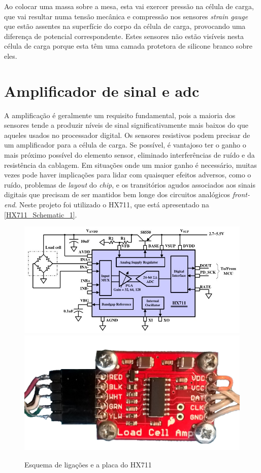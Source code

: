 Ao colocar uma massa sobre a mesa, esta vai exercer pressão na célula de carga, que vai resultar numa tensão mecânica e compressão nos sensores \textit{strain gauge} que estão assentes na superfície do corpo da célula de carga, provocando uma diferença de potencial correspondente. Estes sensores não estão visíveis nesta célula de carga porque esta têm uma camada protetora de silicone branco sobre eles.
\newpage
\section{Amplificador de sinal e \acs{adc}}
A amplificação é geralmente um requisito fundamental, pois a maioria dos sensores tende a produzir níveis de sinal significativamente mais baixos do que aqueles usados no processador digital. Os sensores resistivos podem precisar de um amplificador para a célula de carga. Se possível, é vantajoso ter o ganho o mais próximo possível do elemento sensor, eliminado interferências de ruído e da resistência da cablagem. Em situações onde um maior ganho é necessário, muitas vezes pode haver implicações para lidar com quaisquer efeitos adversos, como o ruído, problemas de \textit{layout} do \textit{chip}, e os transitórios agudos associados aos sinais digitais que precisam de ser mantidos bem longe dos circuitos analógicos \textit{front-end}. \cite{book-9}
\emptyline
Neste projeto foi utilizado o HX711, que está apresentado na \autoref{HX711_Schematic_1}.\\
\begin{figure}[H]
	\centering
	\includegraphics[scale=0.3]{./image/PESTA/schematic/HX711_Schematic_1.jpg}
	\includegraphics[scale=0.09]{./image/PESTA/material/HX711_board_1.jpg}
	\caption{Esquema de ligações e a placa do HX711}
	\label{HX711_Schematic_1}
\end{figure}
